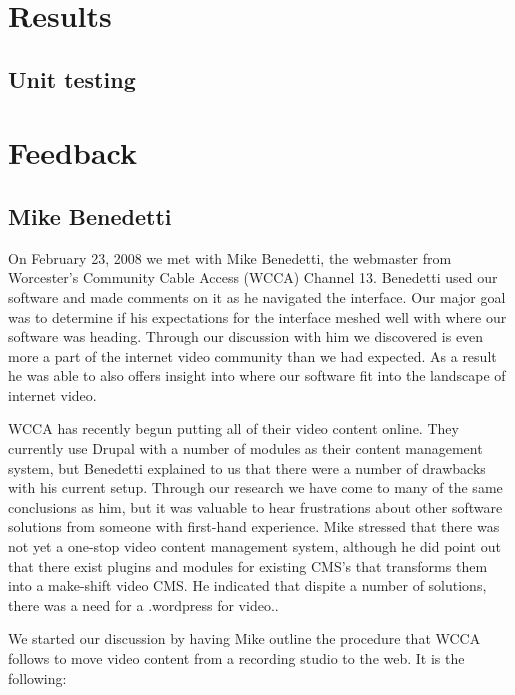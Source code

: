 \documentclass[a4paper,12pt]{report}
\begin{document}
\chapter{Results}

\section{Unit testing}

\chapter{Feedback}

\section{Mike Benedetti}

On February 23, 2008 we met with Mike Benedetti, the webmaster from Worcester's Community Cable Access (WCCA) Channel 
13. 
Benedetti used our software and made comments on it as he navigated the interface. 
Our major goal was to determine if his expectations for the interface meshed well with where our software was heading. 
Through our discussion with him we discovered is even more a part of the internet video community than we had expected. 
As a result he was able to also offers insight into where our software fit into the landscape of internet video.

WCCA has recently begun putting all of their video content online. 
They currently use Drupal with a number of modules as their content management system, but Benedetti explained to us 
that there were a number of drawbacks with his current setup. 
Through our research we have come to many of the same conclusions as him, but it was valuable to hear frustrations about 
other software solutions from someone with first-hand experience. 
Mike stressed that there was not yet a one-stop video content management system, although he did point out that there 
exist plugins and modules for existing CMS's that transforms them into a make-shift video CMS. 
He indicated that dispite a number of solutions, there was a need for a .wordpress for video..

We started our discussion by having Mike outline the procedure that WCCA follows to move video content from a recording 
studio to the web. 
It is the following: 
\end{document}
